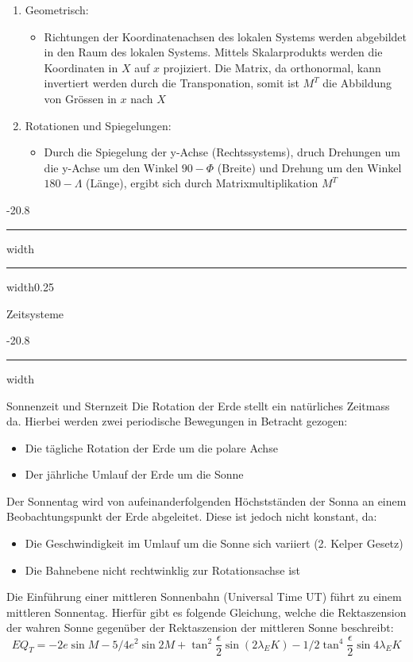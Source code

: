 \documentclass[8pt, landscape, fleqn]{scrartcl}
\makeatletter
\renewcommand{\subsection}{\@startsection{subsection}{1}{0mm}%
{-2\baselineskip}{0.8\baselineskip}%
{\hrule depth 0.2pt width\columnwidth\hrule depth0.75pt
width0.25\columnwidth\vspace*{1.2em}\large\bfseries\rmfamily}}
\renewcommand{\subsubsection}{\@startsection{subsubsection}{1}{0mm}%
{-2\baselineskip}{0.8\baselineskip}%
{\hrule depth 0.2pt width\columnwidth\vspace*{1.2em}\normalsize\bfseries\rmfamily}}
\makeatother
\begin{document}
\begin{multicols*}{3}
\begin{enumerate}
    \item Geometrisch: \begin{itemize}
        \item Richtungen der Koordinatenachsen des lokalen Systems werden abgebildet in den Raum des lokalen Systems. Mittels Skalarprodukts werden die Koordinaten in $X$ auf $x$ projiziert. Die Matrix, da orthonormal, kann invertiert werden durch die Transponation, somit ist $M^T$ die Abbildung von Grössen in $x$ nach $X$
    \end{itemize}
    \item Rotationen und Spiegelungen: \begin{itemize}
        \item Durch die Spiegelung der y-Achse (Rechtssystems), druch Drehungen um die y-Achse um den Winkel $90-\Phi$ (Breite) und Drehung um den Winkel $180-\Lambda$ (Länge), ergibt sich durch Matrixmultiplikation $M^T$ 
    \end{itemize}
\end{enumerate}

\subsection{Zeitsysteme}

\subsubsection{Sonnenzeit und Sternzeit}
Die Rotation der Erde stellt ein natürliches Zeitmass da. Hierbei werden zwei periodische Bewegungen in Betracht gezogen:
\begin{itemize}
    \item Die tägliche Rotation der Erde um die polare Achse
    \item Der jährliche Umlauf der Erde um die Sonne
\end{itemize}

Der Sonnentag wird von aufeinanderfolgenden Höchstständen der Sonna an einem Beobachtungspunkt der Erde abgeleitet. Diese ist jedoch nicht konstant, da:
\begin{itemize}
    \item Die Geschwindigkeit im Umlauf um die Sonne sich variiert (2. Kelper Gesetz)
    \item Die Bahnebene nicht rechtwinklig zur Rotationsachse ist
\end{itemize}

Die Einführung einer mittleren Sonnenbahn (Universal Time UT) führt zu einem mittleren Sonnentag. Hierfür gibt es folgende Gleichung, welche die Rektaszension der wahren Sonne gegenüber der Rektaszension der mittleren Sonne beschreibt:
\begin{equation*}
    EQ_T = -2 e \sin M - 5/4 e^2 \sin 2M + \tan^2 \frac{\epsilon}{2} \sin(2\lambda_EK) - 1/2 \tan^4 \frac{\epsilon}{2} \sin 4\lambda_EK
\end{equation*}


\end{multicols*}
\end{document}
